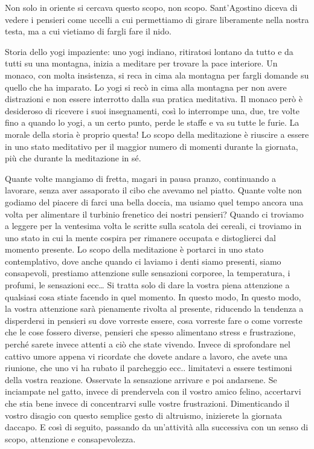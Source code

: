 \documentclass[12pt]{book} %
\begin{document}
Non solo in oriente si cercava questo scopo, non scopo. Sant'Agostino diceva di vedere i pensieri come uccelli a cui
permettiamo di girare liberamente nella nostra testa, ma a cui vietiamo di fargli fare il nido. 

\begin{mdframed}[linewidth=1pt]
Storia dello yogi impaziente: uno yogi indiano, ritiratosi lontano da tutto e da tutti su una montagna, inizia a
meditare per trovare la pace interiore. Un monaco, con molta insistenza, si reca in cima ala montagna per fargli
domande su quello che ha imparato. Lo yogi si recò in cima alla montagna per non avere distrazioni e non essere
interrotto dalla sua pratica meditativa. Il monaco però è desideroso di ricevere i suoi insegnamenti, così lo
interrompe una, due, tre volte fino a quando lo yogi, a un certo punto, perde le staffe e va su tutte le furie. La
morale della storia è proprio questa! Lo scopo della meditazione è riuscire a essere in uno stato meditativo per il
maggior numero di momenti durante la giornata, più che durante la meditazione in sé.
\end{mdframed}

Quante volte mangiamo di fretta, magari in pausa pranzo, continuando a lavorare, senza aver assaporato il cibo che
avevamo nel piatto. Quante volte non godiamo del piacere di farci una bella doccia, ma usiamo quel tempo ancora una
volta per alimentare il turbinio frenetico dei nostri pensieri? Quando ci troviamo a leggere per la ventesima volta le
scritte sulla scatola dei cereali, ci troviamo in uno stato in cui la mente cospira per rimanere occupata e
distoglierci dal momento presente. Lo scopo della meditazione è portarci in uno stato contemplativo, dove anche quando
ci laviamo i denti siamo presenti, siamo consapevoli, prestiamo attenzione sulle sensazioni corporee, la temperatura, i
profumi, le sensazioni ecc… Si tratta solo di dare la vostra piena attenzione a qualsiasi cosa stiate facendo in quel
momento. In questo modo, In questo modo, la vostra attenzione sarà pienamente rivolta al presente, riducendo la tendenza a disperdersi in pensieri su dove vorreste essere, cosa vorreste fare o come vorreste che le cose fossero diverse, pensieri che spesso alimentano stress e frustrazione, perché sarete invece attenti a ciò che state vivendo. Invece di sprofondare nel cattivo umore appena vi ricordate che dovete andare a lavoro, che avete una
riunione, che uno vi ha rubato il parcheggio ecc.. limitatevi a essere testimoni della vostra reazione. 
Osservate la sensazione arrivare e poi andarsene. Se inciampate nel gatto, invece di prendervela con il vostro
amico felino, accertarvi che stia bene invece di concentrarvi sulle vostre frustrazioni. Dimenticando il vostro disagio
con questo semplice gesto di altruismo, inizierete la giornata daccapo. E così di seguito, passando da
un'attività alla successiva con un senso di scopo, attenzione e consapevolezza.
\end{document}
